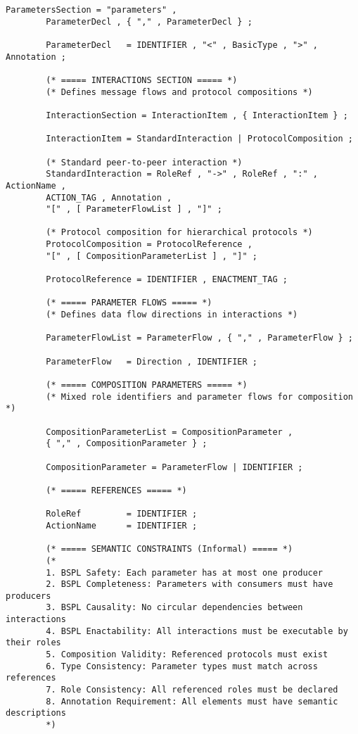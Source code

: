 \documentclass[11pt,a4paper]{article}
\begin{document}
\begin{lstlisting}[caption={BMPP Grammar in EBNF Form},label=lst:ebnf-grammar]
		ParametersSection = "parameters" ,
		ParameterDecl , { "," , ParameterDecl } ;
		
		ParameterDecl   = IDENTIFIER , "<" , BasicType , ">" , Annotation ;
		
		(* ===== INTERACTIONS SECTION ===== *)
		(* Defines message flows and protocol compositions *)
		
		InteractionSection = InteractionItem , { InteractionItem } ;
		
		InteractionItem = StandardInteraction | ProtocolComposition ;
		
		(* Standard peer-to-peer interaction *)
		StandardInteraction = RoleRef , "->" , RoleRef , ":" , ActionName ,
		ACTION_TAG , Annotation ,
		"[" , [ ParameterFlowList ] , "]" ;
		
		(* Protocol composition for hierarchical protocols *)
		ProtocolComposition = ProtocolReference ,
		"[" , [ CompositionParameterList ] , "]" ;
		
		ProtocolReference = IDENTIFIER , ENACTMENT_TAG ;
		
		(* ===== PARAMETER FLOWS ===== *)
		(* Defines data flow directions in interactions *)
		
		ParameterFlowList = ParameterFlow , { "," , ParameterFlow } ;
		
		ParameterFlow   = Direction , IDENTIFIER ;
		
		(* ===== COMPOSITION PARAMETERS ===== *)
		(* Mixed role identifiers and parameter flows for composition *)
		
		CompositionParameterList = CompositionParameter , 
		{ "," , CompositionParameter } ;
		
		CompositionParameter = ParameterFlow | IDENTIFIER ;
		
		(* ===== REFERENCES ===== *)
		
		RoleRef         = IDENTIFIER ;
		ActionName      = IDENTIFIER ;
		
		(* ===== SEMANTIC CONSTRAINTS (Informal) ===== *)
		(*
		1. BSPL Safety: Each parameter has at most one producer
		2. BSPL Completeness: Parameters with consumers must have producers
		3. BSPL Causality: No circular dependencies between interactions
		4. BSPL Enactability: All interactions must be executable by their roles
		5. Composition Validity: Referenced protocols must exist
		6. Type Consistency: Parameter types must match across references
		7. Role Consistency: All referenced roles must be declared
		8. Annotation Requirement: All elements must have semantic descriptions
		*)
	\end{lstlisting}
	
\end{document}
